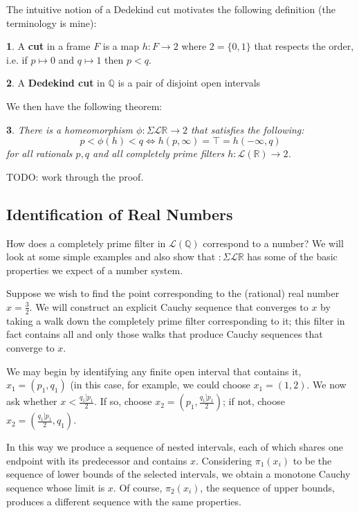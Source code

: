 \documentclass[oneside,english]{amsbook}
\numberwithin{section}{chapter}
\theoremstyle{plain}
\newtheorem{thm}{\protect\theoremname}
\theoremstyle{definition}
\newtheorem{defn}[thm]{\protect\definitionname}
\providecommand{\definitionname}{Definition}
\providecommand{\theoremname}{Theorem}
\begin{document}
The intuitive notion of a Dedekind cut motivates the following definition (the terminology is mine):

\begin{defn}
	A \textbf{cut} in a frame $F$ is a map $h:F\to 2$ where $2 = \{0, 1\}$ that respects the order, i.e. if $p\mapsto 0$ and $q\mapsto 1$ then $p<q$.
\end{defn}

\begin{defn}
	A \textbf{Dedekind cut} in $\mathbb{Q}$ is a pair of disjoint open intervals
\end{defn}

We then have the following theorem:

\begin{thm}
	There is a homeomorphism $\phi:\Sigma\mathscr{L}\mathbb{R}\to 2$ that satisfies the following: 
	\[
	p < \phi(h) < q \Leftrightarrow h(p, \infty) = \top = h(-\infty, q)
	\]	
	for all rationals $p, q$ and all completely prime filters $h:\mathscr{L}(\mathbb{R})\to 2$.
\end{thm}

TODO: work through the proof.

\subsection{Identification of Real Numbers}

How does a completely prime filter in $\mathscr{L}(\mathbb{Q})$ correspond to a number? We will look at some simple examples and also show that $:\Sigma\mathscr{L}\mathbb{R}$ has some of the basic properties we expect of a number system.

Suppose we wish to find the point corresponding to the (rational) real number $x=\frac{3}{2}$. We will construct an explicit Cauchy sequence that converges to $x$ by taking a walk down the completely prime filter corresponding to it; this filter in fact contains all and only those walks that produce Cauchy sequences that converge to $x$.

We may begin by identifying any finite open interval that contains it, $x_1=(p_1, q_1)$ (in this case, for example, we could choose $x_1=(1, 2)$. We now ask whether $x<\frac{q_1]p_1}{2}$. If so, choose $x_2=(p_1, \frac{q_1]p_1}{2})$; if not, choose $x_2=(\frac{q_1]p_1}{2}, q_1)$.

In this way we produce a sequence of nested intervals, each of which shares one endpoint with its predecessor and contains $x$. Considering $\pi_1(x_i)$ to be the sequence of lower bounds of the selected intervals, we obtain a monotone Cauchy sequence whose limit is $x$. Of course, $\pi_2(x_i)$, the sequence of upper bounds, produces a different sequence with the same properties.
\end{document}
